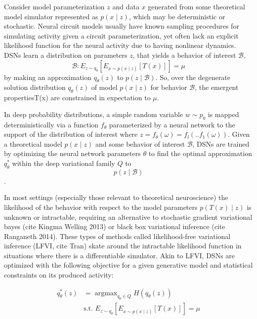 \documentclass[11pt]{article}
\DeclareMathOperator*{\argmax}{argmax}
\begin{document}
Consider model parameterization $z$ and data $x$ generated from some theoretical model simulator represented as $p(x \mid z)$, which may be deterministic or stochastic.  Neural circuit models usually have known sampling procedures for simulating activity given a circuit parameterization, yet often lack an explicit likelihood function for the neural activity due to having nonlinear dynamics. DSNs learn a distribution on parameters $z$, that yields a behavior of interest $\mathcal{B}$,
\begin{equation}
\mathcal{B}: E_{z \sim q_\theta}\left[ E_{x\sim p(x \mid z)}\left[T(x)\right] \right] = \mu
\end{equation}
by making an approximation $q_\theta(z)$ to $p(z \mid \mathcal{B})$.  So, over the degenerate solution distribution $q_\theta(z)$ of model $p(x \mid z)$ for behavior $\mathcal{B}$, the emergent propertiesT(x)  are constrained in expectation to $\mu$.

 In deep probability distributions, a simple random variable $w \sim p_0$ is mapped deterministically via a function $f_\theta$ parameterized by a neural network to the support of the distribution of interest where $z = f_{\theta}(\omega) = f_l(..f_1(\omega))$.  Given a theoretical model $p(x \mid z)$ and some behavior of interest $\mathcal{B}$, DSNs are trained by optimizing the neural network parameters $\theta$ to find the optimal approximation $q_{\theta}^*$ within the deep variational family $Q$ to $$p(z \mid \mathcal{B})$$.

In most settings (especially those relevant to theoretical neuroscience) the likelihood of the behavior with respect to the model parameters $p(T(x) \mid z)$ is unknown or intractable, requiring an alternative to stochastic gradient variational bayes (cite Kingma Welling 2013) or black box variational inference (cite Ranganeth 2014).  These types of methods called likelihood-free variational inference (LFVI, cite Tran) skate around the intractable likelihood function in situations where there is a differentiable simulator. Akin to LFVI, DSNs are optimized with the following objective for a given generative model and statistical constraints on its produced activity:

\begin{equation}
\begin{split}
q_\theta^*(z) &= \argmax_{q_\theta \in Q} H(q_\theta(z)) \\
 &  \text{s.t.  } E_{z \sim q_\theta}\left[ E_{x\sim p(x \mid z)}\left[T(x)\right] \right] = \mu \\
 \end{split}
\end{equation}
\end{document}

